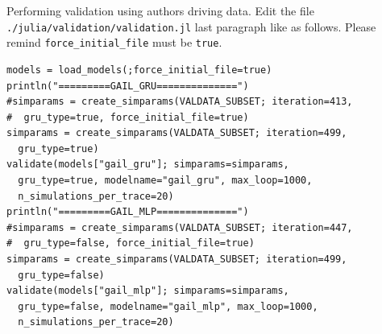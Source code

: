 \documentclass[openany,11pt]{report}%
\begin{document}
Performing validation using authors driving data.
Edit the file {\tt ./julia/validation/validation.jl} last paragraph like as follows.
Please remind {\tt force\_initial\_file} must be {\tt true}. 

\begin{lstlisting}[style=DOS]
models = load_models(;force_initial_file=true)
println("=========GAIL_GRU==============")
#simparams = create_simparams(VALDATA_SUBSET; iteration=413, 
#  gru_type=true, force_initial_file=true)
simparams = create_simparams(VALDATA_SUBSET; iteration=499,
  gru_type=true)
validate(models["gail_gru"]; simparams=simparams, 
  gru_type=true, modelname="gail_gru", max_loop=1000,  
  n_simulations_per_trace=20)
println("=========GAIL_MLP==============")
#simparams = create_simparams(VALDATA_SUBSET; iteration=447, 
#  gru_type=false, force_initial_file=true)
simparams = create_simparams(VALDATA_SUBSET; iteration=499, 
  gru_type=false)
validate(models["gail_mlp"]; simparams=simparams, 
  gru_type=false, modelname="gail_mlp", max_loop=1000, 
  n_simulations_per_trace=20)
\end{lstlisting}
\end{document}
